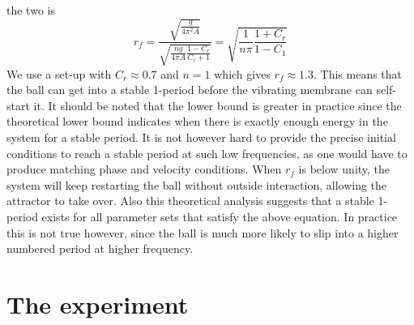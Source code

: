 \documentclass[12pt,oneside,a4paper]{article}
\numberwithin{equation}{section}
\begin{document}
{{{{the two is
\begin{equation}
	r_f=\frac{\sqrt{\frac{g}{4\pi^2A}}}{\sqrt{\frac{ng}{4\pi A}\frac{1-C_r}{C_r+1}}} = \sqrt{\frac{1}{n\pi} \frac{1+C_r}{1-C_1}}
\end{equation}
We use a set-up with $C_r\approx 0.7$ and $n=1$ which gives $r_f\approx1.3$. 
This means that the ball can get into a stable 1-period before the vibrating 
membrane can self-start it. It should be noted that the lower bound is greater 
in practice since the theoretical lower bound indicates when there is exactly 
enough energy in the system for a stable period. It is not however hard to 
provide the precise initial conditions to reach a stable period at such low 
frequencies, as one would have to produce matching phase and velocity 
conditions. When $r_f$ is below unity, the system will keep restarting the ball 
without outside interaction, allowing the attractor to take over. Also this 
theoretical analysis suggests that a stable 1-period exists for all parameter 
sets that satisfy the above equation. In practice this is not true however, 
since the ball is much more likely to slip into a higher numbered period at 
higher frequency. 
\section{The experiment}
\label{expsetup}
}}}}
\end{document}
